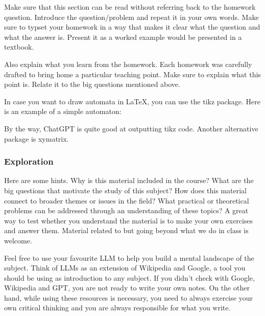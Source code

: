 \documentclass{article}
\theoremstyle{theorem}
\theoremstyle{definition}
\theoremstyle{remark}
\begin{document}
Make sure that this section can be read without referring back to the homework question. Introduce the question/problem and repeat it in your own words. Make sure to typset your homework in a way that makes it clear what  the question and what the answer is. Present it as a worked example would be presented in a textbook. 

Also explain what you learn from the homework. Each homework was carefully drafted to bring home a particular teaching point. Make sure to explain what this point is. Relate it to the big questions mentioned above. 

In case you want to draw automata in \LaTeX{}, you can use the tikz package. Here is an example of a simple automaton:


By the way, ChatGPT is quite good at outputting tikz code. Another alternative package is xymatrix.

\subsubsection{Exploration}

Here are some hints. Why is this material included in the course? What are the big questions that motivate the study of this subject? How does this material connect to broader themes or issues in the field? What practical or theoretical problems can be addressed through an understanding of these topics? A great way to test whether you understand the material is to make your own exercises and answer them. Material related to but going beyond what we do in class is welcome.

Feel free to use your favourite LLM to help you build a mental landscape of the subject. Think of LLMs as an extension of Wikipedia and Google, a tool you should be using as introduction to any subject. If you didn't check with Google, Wikipedia and GPT, you are not ready to write your own notes. On the other hand, while using these resources is necessary, you need to always exercise your own critical thinking and you are always responsible for what you write. 
\end{document}
